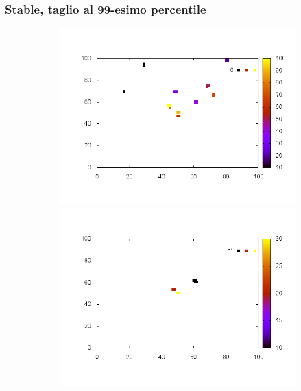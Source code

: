 \documentclass[10pt,a4paper]{article}
\begin{document}
\subsubsection{Stable, taglio al 99-esimo percentile}


\begin{figure}
\centering

\begin{subfigure}[b]{1\textwidth}
\includegraphics[scale=.3]{./img/SCC_Stable3/cut99p/0.png}
\includegraphics[scale=.3]{./img/SCC_Stable3/cut99p/1.png}

\end{subfigure}
\end{figure}
\end{document}
